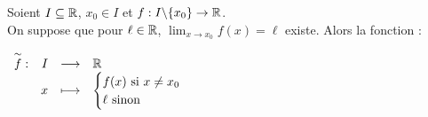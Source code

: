 \begin{definition}
	Soient $I \subseteq \mathbb{R}$, $x_0 \in I$ et $f : I\backslash\{x_0\} \to \mathbb{R}$.
	\\
	On suppose que pour $\ell \in \mathbb{R}$, $\lim_{x \to x_0} f(x) = \ell$ existe. Alors la fonction :
	\begin{center}
		$
		\begin{array}{rrcl} \overset{\sim}{f} : & I & \longrightarrow & \mathbb{R} \\ & x & \longmapsto & 
		\begin{cases}
			f(x) \text{ si } x \neq x_0 \\
			\ell \text{ sinon}
		\end{cases}		
		 \end{array}
		$
	\end{center}
\end{definition}